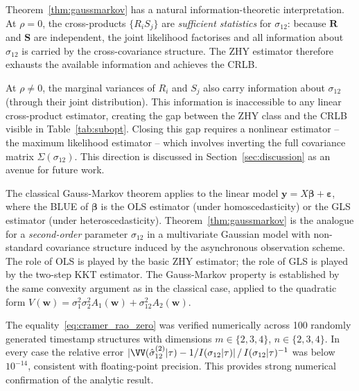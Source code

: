 \begin{remark}
Theorem~\ref{thm:gaussmarkov} has a natural information-theoretic
interpretation.  At $\rho=0$, the cross-products $\{R_iS_j\}$ are
\emph{sufficient statistics} for $\sigma_{12}$: because $\mathbf{R}$
and $\mathbf{S}$ are independent, the joint likelihood factorises
and all information about $\sigma_{12}$ is carried by the
cross-covariance structure.  The ZHY estimator therefore exhausts
the available information and achieves the CRLB.

At $\rho\neq 0$, the marginal variances of $R_i$ and $S_j$ also
carry information about $\sigma_{12}$ (through their joint
distribution).  This information is inaccessible to any linear
cross-product estimator, creating the gap between the ZHY class
and the CRLB visible in Table~\ref{tab:subopt}.  Closing this gap
requires a nonlinear estimator -- the maximum likelihood estimator --
which involves inverting the full covariance matrix $\Sigma(\sigma_{12})$.
This direction is discussed in Section~\ref{sec:discussion} as an
avenue for future work.
\end{remark}

\begin{remark}
The classical Gauss-Markov theorem applies to the linear model
$\mathbf{y} = X\boldsymbol\beta + \boldsymbol\varepsilon$, where
the BLUE of $\boldsymbol\beta$ is the OLS estimator (under
homoscedasticity) or the GLS estimator (under heteroscedasticity).
Theorem~\ref{thm:gaussmarkov} is the analogue for a
\emph{second-order} parameter $\sigma_{12}$ in a multivariate
Gaussian model with non-standard covariance structure induced by the
asynchronous observation scheme.  The role of OLS is played by the
basic ZHY estimator; the role of GLS is played by the two-step
KKT estimator.  The Gauss-Markov property is established by the
same convexity argument as in the classical case, applied to the
quadratic form $V(\mathbf{w}) = \sigma_1^2\sigma_2^2 A_1(\mathbf{w})
+ \sigma_{12}^2 A_2(\mathbf{w})$.
\end{remark}

\begin{remark}
The equality~\eqref{eq:cramer_rao_zero} was verified numerically
across 100 randomly generated timestamp structures with dimensions
$m \in \{2,3,4\}$, $n \in \{2,3,4\}$.  In every case the relative
error $|\VV(\hat\sigma_{12}^{(2)}|\tau) - 1/I(\sigma_{12}|\tau)|
\,/\,I(\sigma_{12}|\tau)^{-1}$ was below $10^{-14}$, consistent
with floating-point precision.  This provides strong numerical
confirmation of the analytic result.
\end{remark}
